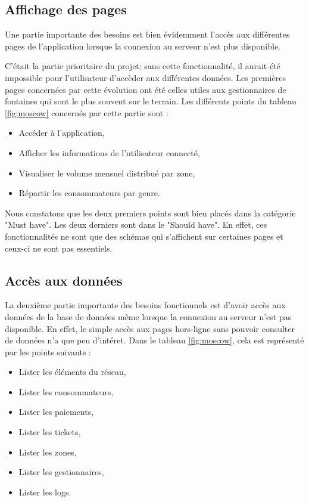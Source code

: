 \documentclass{EPL-master-thesis-covers-FR}
\begin{document}
			
			\subsection*{Affichage des pages}
				Une partie importante des besoins est bien évidemment l'accès aux différentes pages de l'application lorsque la connexion au serveur n'est plus disponible. 
				
				C'était la partie prioritaire du projet; sans cette fonctionnalité, il aurait été impossible pour l'utilisateur d'accèder aux différentes données. Les premières pages concernées par cette évolution ont été celles utiles aux gestionnaires de fontaines qui sont le plus souvent sur le terrain.
				Les différents points du tableau \ref{fig:moscow} concernés par cette partie sont :
				\begin{itemize}
					\item Accéder à l'application,
					\item Afficher les informations de l'utilisateur connecté,
					\item Visualiser le volume mensuel distribué par zone,
					\item Répartir les consommateurs par genre.
				\end{itemize}
				
				Nous constatons que les deux premiers points sont bien placés dans la catégorie "Must have". Les deux derniers sont dans le "Should have". En effet, ces fonctionnalités ne sont que des schémas qui s'affichent sur certaines pages et ceux-ci ne sont pas essentiels.
				
				
			\subsection*{Accès aux données}
				La deuxième partie importante des besoins fonctionnels est d'avoir accès aux données de la base de données même lorsque la connexion au serveur n'est pas disponible. En effet, le simple accès aux pages hors-ligne sans pouvoir consulter de données n'a que peu d'intéret.
			Dans le tableau \ref{fig:moscow}, cela est représenté par les points suivants :
				\begin{itemize}
					\item Lister les éléments du réseau,
					\item Lister les consommateurs,
					\item Lister les paiements,
					\item Lister les tickets,
					\item Lister les zones,
					\item Lister les gestionnaires,
					\item Lister les logs.
				\end{itemize}
				
\end{document}
